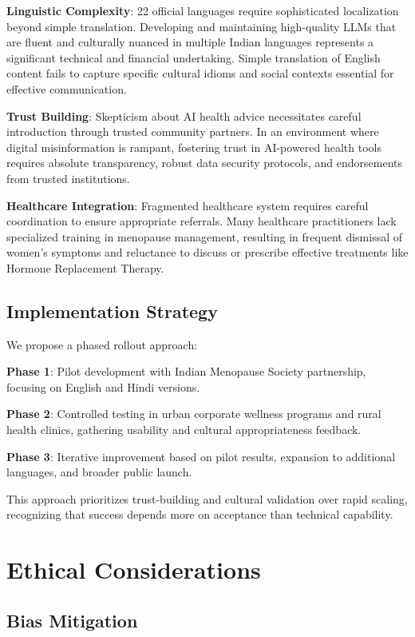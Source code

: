 \documentclass[letterpaper]{article} %
\begin{document}
\textbf{Linguistic Complexity}: 22 official languages require sophisticated localization beyond simple translation. Developing and maintaining high-quality LLMs that are fluent and culturally nuanced in multiple Indian languages represents a significant technical and financial undertaking. Simple translation of English content fails to capture specific cultural idioms and social contexts essential for effective communication.

\textbf{Trust Building}: Skepticism about AI health advice necessitates careful introduction through trusted community partners. In an environment where digital misinformation is rampant, fostering trust in AI-powered health tools requires absolute transparency, robust data security protocols, and endorsements from trusted institutions.

\textbf{Healthcare Integration}: Fragmented healthcare system requires careful coordination to ensure appropriate referrals. Many healthcare practitioners lack specialized training in menopause management, resulting in frequent dismissal of women's symptoms and reluctance to discuss or prescribe effective treatments like Hormone Replacement Therapy.

\subsection{Implementation Strategy}

We propose a phased rollout approach:

\textbf{Phase 1}: Pilot development with Indian Menopause Society partnership, focusing on English and Hindi versions.

\textbf{Phase 2}: Controlled testing in urban corporate wellness programs and rural health clinics, gathering usability and cultural appropriateness feedback.

\textbf{Phase 3}: Iterative improvement based on pilot results, expansion to additional languages, and broader public launch.

This approach prioritizes trust-building and cultural validation over rapid scaling, recognizing that success depends more on acceptance than technical capability.

\section{Ethical Considerations}

\subsection{Bias Mitigation}
\end{document}
